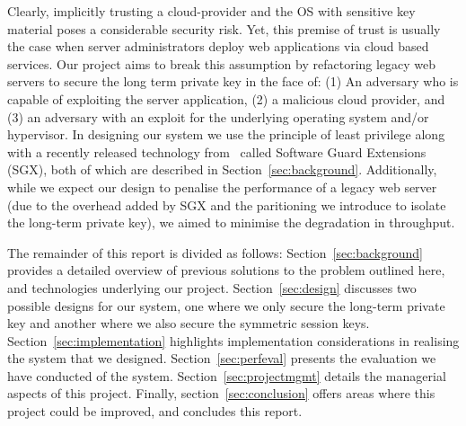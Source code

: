 \documentclass[../main.tex]{subfiles}
\begin{document}
Clearly, implicitly trusting a cloud-provider and the OS with
sensitive key material poses a considerable security risk. Yet, this
premise of trust is usually the case when server administrators deploy
web applications via cloud based services. Our project aims to break
this assumption by refactoring legacy web servers to secure the long
term private key in the face of: (1) An adversary who is capable of
exploiting the server application, (2) a malicious cloud provider, and
(3) an adversary with an exploit for the underlying operating system
and/or hypervisor. In designing our system we use the principle of
least privilege along with a recently released technology from
\Intel~called Software Guard Extensions (SGX), both of which are
described in Section~\ref{sec:background}. Additionally, while we
expect our design to penalise the performance of a legacy web server
(due to the overhead added by SGX and the paritioning we introduce to
isolate the long-term private key), we aimed to minimise the
degradation in throughput.

The remainder of this report is divided as follows:
Section~\ref{sec:background} provides a detailed overview of previous
solutions to the problem outlined here, and technologies underlying
our project. Section~\ref{sec:design} discusses two possible designs
for our system, one where we only secure the long-term private key and
another where we also secure the symmetric session keys.
Section~\ref{sec:implementation} highlights implementation
considerations in realising the system that we designed.
Section~\ref{sec:perfeval} presents the evaluation we have conducted
of the system. Section~\ref{sec:projectmgmt} details the managerial
aspects of this project. Finally, section~\ref{sec:conclusion}
offers areas where this project could be improved, and concludes this
report.
	
\end{document}

